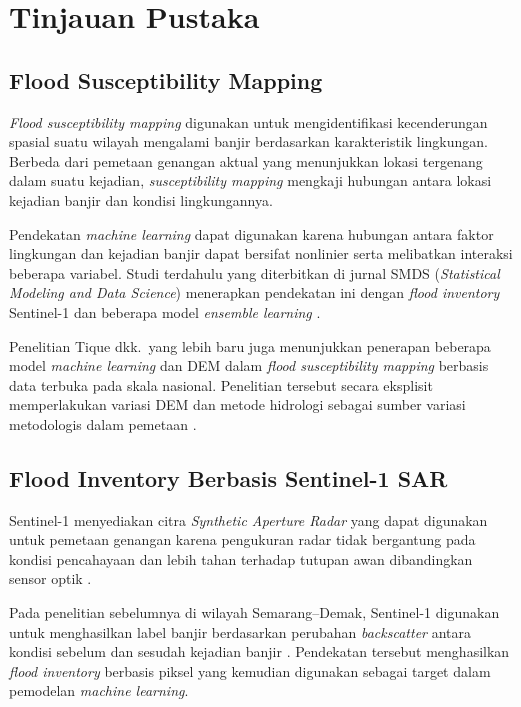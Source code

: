 \documentclass[12pt]{article}
\begin{document}

\clearpage
\section{Tinjauan Pustaka}

\subsection{Flood Susceptibility Mapping}

\textit{Flood susceptibility mapping} digunakan untuk mengidentifikasi
kecenderungan spasial suatu wilayah mengalami banjir berdasarkan
karakteristik lingkungan. Berbeda dari pemetaan genangan aktual yang
menunjukkan lokasi tergenang dalam suatu kejadian, \textit{susceptibility mapping}
mengkaji hubungan antara lokasi kejadian banjir dan kondisi lingkungannya.

Pendekatan \textit{machine learning} dapat digunakan karena hubungan antara
faktor lingkungan dan kejadian banjir dapat bersifat nonlinier serta melibatkan
interaksi beberapa variabel. Studi terdahulu yang diterbitkan di jurnal
SMDS (\textit{Statistical Modeling and Data Science}) menerapkan pendekatan
ini dengan \textit{flood inventory} Sentinel-1 dan beberapa model
\textit{ensemble learning} \cite{hakim2026}.

Penelitian Tique dkk.\ yang lebih baru juga menunjukkan penerapan beberapa
model
\textit{machine learning} dan DEM dalam \textit{flood susceptibility mapping}
berbasis data terbuka pada skala nasional. Penelitian tersebut secara
eksplisit memperlakukan variasi DEM dan metode hidrologi sebagai sumber
variasi metodologis dalam pemetaan \cite{Tique2026}.

\subsection{Flood Inventory Berbasis Sentinel-1 SAR}

Sentinel-1 menyediakan citra \textit{Synthetic Aperture Radar} yang dapat
digunakan untuk pemetaan genangan karena pengukuran radar tidak bergantung
pada kondisi pencahayaan dan lebih tahan terhadap tutupan awan dibandingkan
sensor optik \cite{islammeng2022,unspider2024}.

Pada penelitian sebelumnya di wilayah Semarang--Demak, Sentinel-1 digunakan
untuk menghasilkan label banjir berdasarkan perubahan \textit{backscatter}
antara kondisi sebelum dan sesudah kejadian banjir \cite{hakim2026}.
Pendekatan tersebut menghasilkan \textit{flood inventory} berbasis piksel
yang kemudian digunakan sebagai target dalam pemodelan \textit{machine
learning}.
\end{document}
